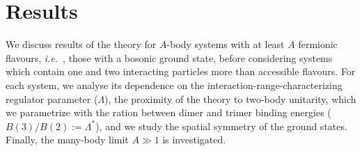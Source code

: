 \documentclass[preprint,12pt]{elsarticle}
\newcommand{\ie}{\textit{i.e.}~}
\begin{document}





\section{Results}

We discuss results of the theory for $A$-body systems with at least $A$ fermionic
flavours, \ie, those with a bosonic ground state, before considering systems
which contain one and two interacting particles more than accessible flavours.
For each system, we analyse its dependence on the interaction-range-characterizing
regulator parameter ($\Lambda$), the proximity of the theory to two-body unitarity, which we parametrize with the ration between dimer and trimer binding energies
($B(3)/B(2):=\Lambda^*$), and we study the spatial symmetry of the ground states.
Finally, the many-body limit $A\gg1$ is investigated.
\end{document}
